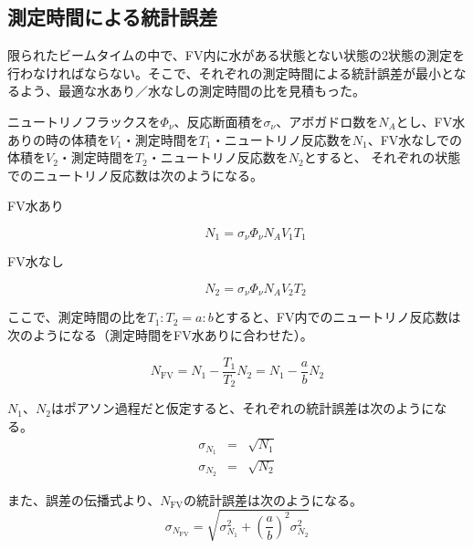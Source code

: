 \documentclass[11pt]{jreport}
\newcommand{\fv}{\mathrm{FV}}
\begin{document}
\subsection{測定時間による統計誤差}
限られたビームタイムの中で、FV内に水がある状態とない状態の2状態の測定を行わなければならない。そこで、それぞれの測定時間による統計誤差が最小となるよう、最適な水あり／水なしの測定時間の比を見積もった。

ニュートリノフラックスを$\Phi_{\nu}$、反応断面積を$\sigma_{\nu}$、アボガドロ数を$N_{A}$とし、FV水ありの時の体積を$V_{1}$・測定時間を$T_{1}$・ニュートリノ反応数を$N_{1}$、FV水なしでの体積を$V_{2}$・測定時間を$T_{2}$・ニュートリノ反応数を$N_{2}$とすると、
それぞれの状態でのニュートリノ反応数は次のようになる。

\begin{description}
\item [FV水あり]%
\begin{equation}
N_{1} = \sigma_{\nu}\Phi_{\nu}N_{A}V_{1}T_{1}
\label{Nww}
\end{equation}
%
\item [FV水なし]
\begin{equation}
N_{2} = \sigma_{\nu}\Phi_{\nu}N_{A}V_{2}T_{2}
\label{Nwow}
\end{equation}
\end{description}

ここで、測定時間の比を$T_{1}:T_{2}=a:b$とすると、FV内でのニュートリノ反応数は次のようになる（測定時間をFV水ありに合わせた）。

\begin{equation}
N_{\fv} = N_{1}-\frac{T_{1}}{T_{2}}N_{2} = N_{1}-\frac{a}{b}N_{2}
\label{Nfv}
\end{equation}

$N_{1}$、$N_{2}$はポアソン過程だと仮定すると、それぞれの統計誤差は次のようになる。
\begin{eqnarray}
\sigma_{N_{1}} & = & \sqrt{N_{1}} \label{sigma1}\\
\sigma_{N_{2}} & = & \sqrt{N_{2}} \label{sigma2}
\end{eqnarray}

また、誤差の伝播式より、$N_{\fv}$の統計誤差は次のようになる。
\begin{equation}
\sigma_{N_{\fv}} = \sqrt{\sigma_{N_{1}}^{2}+\left(\frac{a}{b}\right)^{2}\sigma_{N_{2}}^{2}} \label{sigmafv}
\end{equation}
\end{document}
